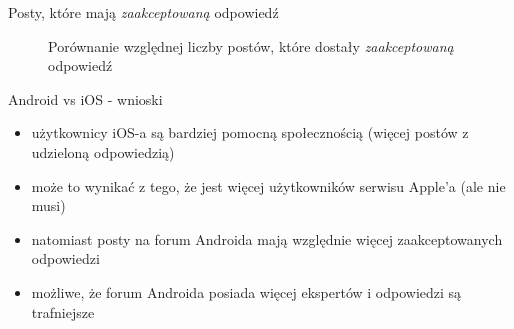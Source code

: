\documentclass[./main.tex]{subfiles}
\begin{document}
\begin{frame}{Posty, które mają \textit{zaakceptowaną} odpowiedź}

\begin{figure}%
    \centering
    \qquad
    \caption*{Porównanie względnej liczby postów, które dostały \textit{zaakceptowaną} odpowiedź}
    \label{fig:example}%
\end{figure}
    
\end{frame}

\begin{frame}{Android vs iOS - wnioski}
    \begin{itemize}
        \item użytkownicy iOS-a są bardziej pomocną społecznością (więcej postów z udzieloną odpowiedzią)
        \item może to wynikać z tego, że jest więcej użytkowników serwisu Apple'a (ale nie musi)
        \item natomiast posty na forum Androida mają względnie więcej zaakceptowanych odpowiedzi
        \item możliwe, że forum Androida posiada więcej ekspertów i odpowiedzi są trafniejsze
    \end{itemize}
\end{frame}
\end{document}
